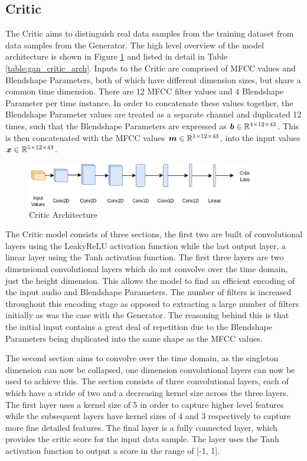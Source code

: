 \subsection{Critic}
The Critic aims to distinguish real data samples from the training dataset from data samples from the Generator.
The high level overview of the model architecture is shown in Figure \ref{fig:gan_critic_arch} and listed in detail in Table \ref{table:gan_critic_arch}.
Inputs to the Critic are comprised of MFCC values and Blendshape Parameters, both of which have different dimension sizes, but share a common time dimension. 
There are 12 MFCC filter values and 4 Blendshape Parameter per time instance.
In order to concatenate these values together, the Blendshape Parameter values are treated as a separate channel and duplicated 12 times, such that the Blendshape Parameters are expressed as ${\boldsymbol{{b}}} \in \mathbb{R}^{4 \times 12 \times 43}$.
This is then concatenated with the MFCC values ${\boldsymbol{{m}}} \in \mathbb{R}^{1 \times 12 \times 43}$, into the input values ${\boldsymbol{{x}}} \in \mathbb{R}^{5 \times 12 \times 43}$.

\begin{figure}[h!]
    \centering
        \includegraphics[width=0.9\textwidth]{figures/gan/critic.png}
    \caption{Critic Architecture}\label{fig:gan_critic_arch}
\end{figure}

The Critic model consists of three sections, the first two are built of convolutional layers using the LeakyReLU activation function while the last output layer, a linear layer using the Tanh activation function.
The first three layers are two dimensional convolutional layers which do not convolve over the time domain, just the height dimension.
This allows the model to find an efficient encoding of the input audio and Blendshape Parameters.
The number of filters is increased throughout this encoding stage as opposed to extracting a large number of filters initially as was the case with the Generator.
The reasoning behind this is that the initial input contains a great deal of repetition due to the Blendshape Parameters being duplicated into the same shape as the MFCC values.

The second section aims to convolve over the time domain, as the singleton dimension can now be collapsed, one dimension convolutional layers can now be used to achieve this.
The section consists of three convolutional layers, each of which have a stride of two and a decreasing kernel size across the three layers.
The first layer uses a kernel size of 5 in order to capture higher level features while the subsequent layers have kernel sizes of 4 and 3 respectively to capture more fine detailed features.
The final layer is a fully connected layer, which provides the critic score for the input data sample.
The layer uses the Tanh activation function to output a score in the range of [-1, 1].

